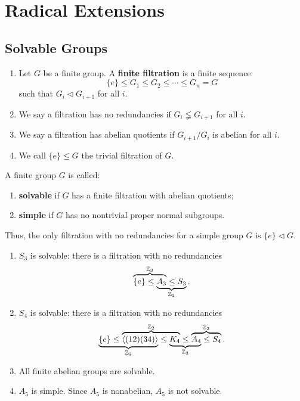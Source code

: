 \chapter{Radical Extensions}

\section{Solvable Groups}

\begin{definition}
    \begin{enumerate}
        \item Let $G$ be a finite group. A {\bf finite filtration} is a finite sequence
        \[
        \{e\}\leq G_{1}\leq G_{2}\leq \cdots \leq G_{n}=G
        \]
        such that $G_i\lhd G_{i+1}$ for all $i$.
        \item We say a filtration has no redundancies if $G_i\lneqq G_{i+1}$ for all $i$.
        \item We say a filtration has abelian quotients if $G_{i+1}/G_i$ is abelian for all $i$.
        \item We call $\{e\}\leq G$ the trivial filtration of $G$.
    \end{enumerate}
\end{definition}

\begin{definition}\label{def-solvgp}
    A finite group $G$ is called:
    \begin{enumerate}
        \item {\bf solvable} if $G$ has a finite filtration with abelian quotients;
        \item {\bf simple} if $G$ has no nontrivial proper normal subgroups.
    \end{enumerate}
    Thus, the only filtration with no redundancies for a simple group $G$ is
    $\{e\}\lhd G$.
\end{definition}

\begin{example}
    \begin{enumerate}
        \item $S_3$ is solvable: there is a filtration with no redundancies
        \[
        \lefteqn{\overbrace{\phantom{\{e\}\leq A_3}}^{\mathbb Z_3}}\{e\}
        \leq \underbrace{A_3\leq S_3}_{\mathbb Z_2}.
        \]

        \item $S_4$ is solvable: there is a filtration with no redundancies
        \[
        \lefteqn{\underbrace{\phantom{\{e\}\leq \langle(12)(34)\rangle}}_{\mathbb Z_2}}
        \{e\}\leq
        \overbrace{\langle(12)(34)\rangle\leq
        \lefteqn{\underbrace{\phantom{K_4\leq A_4}}_{\mathbb Z_3}}K_4}^{\mathbb Z_2}
        \leq \overbrace{A_4\leq S_4}^{\mathbb Z_2}.
        \]

        \item All finite abelian groups are solvable.

        \item $A_5$ is simple. Since $A_5$ is nonabelian, $A_5$ is not solvable.
    \end{enumerate}
\end{example}

